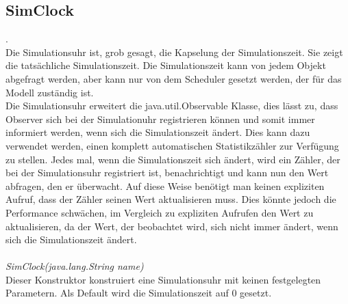 \documentclass[runningheads]{llncs}
\begin{document}
\subsection{SimClock}
.\\
Die Simulationsuhr ist, grob gesagt, die Kapselung der Simulationszeit. Sie zeigt die tatsächliche Simulationszeit. Die Simulationszeit kann von jedem Objekt abgefragt werden, aber kann nur von dem Scheduler gesetzt werden, der für das Modell zuständig ist.\\
Die Simulationsuhr erweitert die java.util.Observable Klasse, dies lässt zu, dass Observer sich bei der Simulationuhr registrieren können und somit immer informiert werden, wenn sich die Simulationszeit ändert. Dies kann dazu verwendet werden, einen komplett automatischen Statistikzähler zur Verfügung zu stellen. Jedes mal, wenn die Simulationszeit sich ändert, wird ein Zähler, der bei der Simulationsuhr registriert ist, benachrichtigt und kann nun den Wert abfragen, den er überwacht. Auf diese Weise benötigt man keinen expliziten Aufruf, dass der Zähler seinen Wert aktualisieren muss. Dies könnte jedoch die Performance schwächen, im Vergleich zu expliziten Aufrufen den Wert zu aktualisieren, da der Wert, der beobachtet wird, sich nicht immer ändert, wenn sich die Simulationszeit ändert.\\
 \\
\textit{SimClock(java.lang.String name)}\\
Dieser Konstruktor konstruiert eine Simulationsuhr mit keinen festgelegten Parametern. Als Default wird die Simulationszeit auf 0 gesetzt.\\
\end{document}
